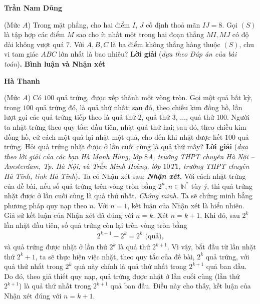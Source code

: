 \begin{multicols}{2}
	\begin{flushright}
		\textbf{\color{thachthuctoanhoc}Trần Nam Dũng}
	\end{flushright}
	{\color{thachthuctoanhoc}{\usefont{T5}{qag}{b}{n} P678.}}
	(Mức $A$) Trong mặt phẳng, cho hai điểm $I$, $J$ cố định thoả mãn $IJ=8$.  Gọi $(S)$ là tập hợp các điểm $M$ sao cho ít nhất một trong hai đoạn thẳng $MI,MJ$ có độ dài không vượt quá $7$. Với $A,B,C$ là ba điểm không thẳng hàng thuộc $(S)$, chu vi tam giác $ABC$ lớn nhất là bao nhiêu?
	\vskip 0.05cm
	\textbf{\color{thachthuctoanhoc}Lời giải} (\textit{dựa theo Đáp án của bài toán})\textbf{\color{thachthuctoanhoc}.}
	\vskip 0.05cm
	\textbf{\color{thachthuctoanhoc}Bình luận và Nhận xét}	
	\begin{flushright}
		\textbf{\color{thachthuctoanhoc}Hà Thanh}
	\end{flushright}
	{\color{thachthuctoanhoc}{\usefont{T5}{qag}{b}{n} P679.}}
	(Mức $A$) Có $100$ quả trứng, được xếp thành một vòng tròn. Gọi một quả bất kỳ, trong $100$ quả trứng đó, là quả thứ nhất; sau đó, theo chiều kim đồng hồ, lần lượt gọi các quả trứng tiếp theo là quả thứ $2$, quả thứ $3$, $\ldots$, quả thứ $100$. Người ta nhặt trứng theo quy tắc: đầu tiên, nhặt quả thứ hai; sau đó, theo chiều kim đồng hồ, cứ cách một quả lại nhặt một quả, cho đến khi nhặt được hết $100$ quả trứng. Hỏi quả trứng nhặt được ở lần cuối cùng là quả thứ mấy?
	\vskip 0.05cm
	\textbf{\color{thachthuctoanhoc}Lời giải} (\textit{dựa theo lời giải của các bạn Hà Mạnh Hùng, lớp $8$A, trường THPT chuyên Hà Nội -- Amsterdam, Tp. Hà Nội, và Trần Minh Hoàng, lớp $10$T$1$, trường THPT chuyên Hà Tĩnh, tỉnh Hà Tĩnh})\textbf{\color{thachthuctoanhoc}.}
	\vskip 0.05cm
	Ta có Nhận xét sau:
	\vskip 0.05cm
	\textbf{\color{thachthuctoanhoc}\textit{Nhận xét.}} Với cách nhặt trứng của đề bài, nếu số quả trứng trên vòng tròn bằng  $2^n,n \in \mathbb{N^*}$ tùy ý, thì quả trứng nhặt được ở lần cuối cùng là quả thứ nhất.
	\vskip 0.05cm
	\textit{Chứng minh.} Ta sẽ chứng minh bằng phương pháp quy nạp theo $n$.
	\vskip 0.05cm
	Với $n = 1$, kết luận của Nhận xét là hiển nhiên.
	\vskip 0.05cm
	Giả sử kết luận của Nhận xét đã đúng với $n = k$.
	\vskip 0.05cm
	Xét $n = k + 1$.
	\vskip 0.05cm
	Khi đó, sau $2^k$  lần nhặt đầu tiên, số quả trứng còn lại trên vòng tròn bằng
	\begin{align*}
		{2^{k + 1}} - {2^k} = {2^k} \text{ (quả),}
	\end{align*}
	và quả trứng được nhặt ở lần thứ  $2^k$ là quả thứ $2^{k+1}$.
	\vskip 0.05cm 
	Vì vậy, bắt đầu từ lần nhặt thứ $2^k +1$,  ta sẽ thực hiện việc nhặt, theo quy tắc của đề bài, $2^k$  quả trứng, với quả thứ nhất trong $2^k$  quả này chính là quả thứ nhất trong $2^{k+1}$  quả ban đầu. Do đó, theo giả thiết quy nạp, quả trứng được nhặt ở lần cuối cùng (lần thứ  $2^{k+1}$) là quả thứ nhất trong $2^{k+1}$  quả ban đầu. Điều này cho thấy, kết luận của Nhận xét đúng với $n = k + 1$.

\end{multicols}
